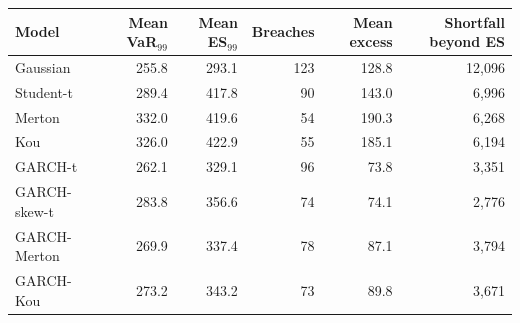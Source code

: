 \begin{tabular}{lrrrrr}
\toprule
Model & Mean VaR$_{99}$ & Mean ES$_{99}$ & Breaches & Mean excess & Shortfall beyond ES \\
\midrule
Gaussian & 255.8 & 293.1 & 123 & 128.8 & 12,096 \\
Student-t & 289.4 & 417.8 & 90 & 143.0 & 6,996 \\
Merton & 332.0 & 419.6 & 54 & 190.3 & 6,268 \\
Kou & 326.0 & 422.9 & 55 & 185.1 & 6,194 \\
GARCH-t & 262.1 & 329.1 & 96 & 73.8 & 3,351 \\
GARCH-skew-t & 283.8 & 356.6 & 74 & 74.1 & 2,776 \\
GARCH-Merton & 269.9 & 337.4 & 78 & 87.1 & 3,794 \\
GARCH-Kou & 273.2 & 343.2 & 73 & 89.8 & 3,671 \\
\bottomrule
\end{tabular}
